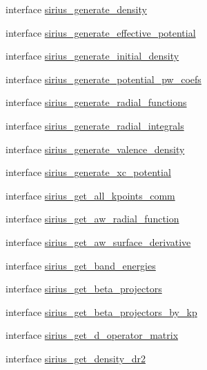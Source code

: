 \begin{DoxyCompactItemize}
interface \hyperlink{interfacesirius_1_1sirius__generate__density}{sirius\+\_\+generate\+\_\+density}
\item 
interface \hyperlink{interfacesirius_1_1sirius__generate__effective__potential}{sirius\+\_\+generate\+\_\+effective\+\_\+potential}
\item 
interface \hyperlink{interfacesirius_1_1sirius__generate__initial__density}{sirius\+\_\+generate\+\_\+initial\+\_\+density}
\item 
interface \hyperlink{interfacesirius_1_1sirius__generate__potential__pw__coefs}{sirius\+\_\+generate\+\_\+potential\+\_\+pw\+\_\+coefs}
\item 
interface \hyperlink{interfacesirius_1_1sirius__generate__radial__functions}{sirius\+\_\+generate\+\_\+radial\+\_\+functions}
\item 
interface \hyperlink{interfacesirius_1_1sirius__generate__radial__integrals}{sirius\+\_\+generate\+\_\+radial\+\_\+integrals}
\item 
interface \hyperlink{interfacesirius_1_1sirius__generate__valence__density}{sirius\+\_\+generate\+\_\+valence\+\_\+density}
\item 
interface \hyperlink{interfacesirius_1_1sirius__generate__xc__potential}{sirius\+\_\+generate\+\_\+xc\+\_\+potential}
\item 
interface \hyperlink{interfacesirius_1_1sirius__get__all__kpoints__comm}{sirius\+\_\+get\+\_\+all\+\_\+kpoints\+\_\+comm}
\item 
interface \hyperlink{interfacesirius_1_1sirius__get__aw__radial__function}{sirius\+\_\+get\+\_\+aw\+\_\+radial\+\_\+function}
\item 
interface \hyperlink{interfacesirius_1_1sirius__get__aw__surface__derivative}{sirius\+\_\+get\+\_\+aw\+\_\+surface\+\_\+derivative}
\item 
interface \hyperlink{interfacesirius_1_1sirius__get__band__energies}{sirius\+\_\+get\+\_\+band\+\_\+energies}
\item 
interface \hyperlink{interfacesirius_1_1sirius__get__beta__projectors}{sirius\+\_\+get\+\_\+beta\+\_\+projectors}
\item 
interface \hyperlink{interfacesirius_1_1sirius__get__beta__projectors__by__kp}{sirius\+\_\+get\+\_\+beta\+\_\+projectors\+\_\+by\+\_\+kp}
\item 
interface \hyperlink{interfacesirius_1_1sirius__get__d__operator__matrix}{sirius\+\_\+get\+\_\+d\+\_\+operator\+\_\+matrix}
\item 
interface \hyperlink{interfacesirius_1_1sirius__get__density__dr2}{sirius\+\_\+get\+\_\+density\+\_\+dr2}

\end{DoxyCompactItemize}
